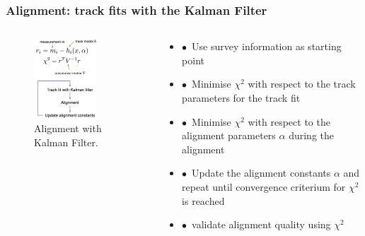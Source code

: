 \documentclass[aspectratio=1610, 12pt]{beamer}
\begin{document}
\begin{frame}\frametitle{Alignment: track fits with the Kalman Filter}
  \begin{columns}
    \begin{column}[c]{0.48\textwidth}
      \begin{figure}
        \centering
        \includegraphics[width=0.72\textwidth]{logos/kalman.png}
        \caption{Alignment with Kalman Filter.}
      \end{figure}
    \end{column}
    \begin{column}[c]{0.48\textwidth}
      \begin{itemize}
        \item $\bullet$\, Use survey information as starting point
        \item $\bullet$\, Minimise $\chi^2$ with respect to the track parameters for the track fit
        \item $\bullet$\, Minimise $\chi^2$ with respect to the alignment parameters $\alpha$ during the alignment
        \item $\bullet$\, Update the alignment constants $\alpha$ and repeat until convergence criterium for $\chi^2$ is reached
        \item $\bullet$\, validate alignment quality using $\chi^2$
      \end{itemize}
    \end{column}
  \end{columns}
\end{frame}
\end{document}
